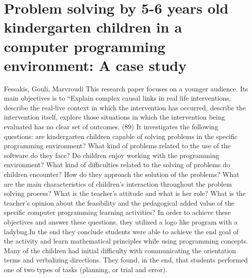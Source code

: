 \documentclass[12pt]{extarticle}
\begin{document}
\section{Problem solving by 5-6 years old kindergarten children in a computer programming environment: A case study}
Fessakis, Gouli, Marvroudi
This research paper focuses on a younger audience. Its main objectives is to “Explain complex causal links in real life interventions, describe the real-live context in which the intervention has occurred, describe the intervention itself, explore those situations in which the intervention being evaluated has no clear set of outcomes. (89)
It investigates the following questions: are kindergarten children capable of solving problems in the specific programming environment? What kind of problems related to the use of the software do they face? Do children enjoy working with the programming environment? What kind of difficulties related to the solving of problems do children encounter?  How do they approach the solution of the problems? What are the main characteristics of children’s interaction throughout the problem solving process? What is the teacher’s attitude and what is her role? What is the teacher’s opinion about the feasibility and the pedagogical added value of the specific computer programming learning activities? 
In order to achieve these objectives and answer these questions, they utilized a logo like program with a ladybug.In the end they conclude students were able to achieve the end goal of the activity and learn mathematical principles while using programming concepts. Many of the children had initial difficulty with communicating the orientation terms and verbalizing directions. They found, in the end, that students performed one of two types of tasks (planning, or trial and error).
\end{document}
